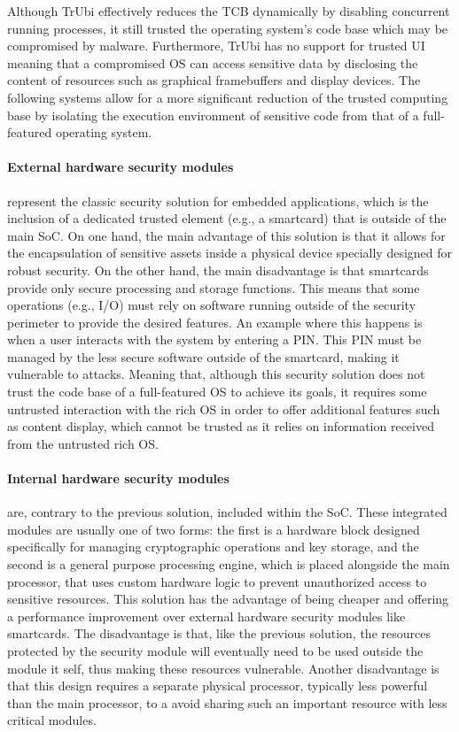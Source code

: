 Although TrUbi effectively reduces the TCB dynamically by disabling concurrent running processes, it still trusted the operating system's code base which may be compromised by malware. Furthermore, TrUbi has no support for trusted UI meaning that a compromised OS can access sensitive data by disclosing the content of resources such as graphical framebuffers and display devices. The following systems allow for a more significant reduction of the trusted computing base by isolating the execution environment of sensitive code from that of a full-featured operating system.

\paragraph{\textbf{External hardware security modules}} represent the classic security solution for embedded applications, which is the inclusion of a dedicated trusted element (e.g., a smartcard) that is outside of the main \ac{SoC}. On one hand, the main advantage of this solution is that it allows for the encapsulation of sensitive assets inside a physical device specially designed for robust security. On the other hand, the main disadvantage is that smartcards provide only secure processing and storage functions. This means that some operations (e.g., I/O) must rely on software running outside of the security perimeter to provide the desired features. An example where this happens is when a user interacts with the system by entering a \ac{PIN}. This \ac{PIN} must be managed by the less secure software outside of the smartcard, making it vulnerable to attacks. Meaning that, although this security solution does not trust the code base of a full-featured OS to achieve its goals, it requires some untrusted interaction with the rich OS in order to offer additional features such as content display, which cannot be trusted as it relies on information received from the untrusted rich OS.

\paragraph{\textbf{Internal hardware security modules}} are, contrary to the previous solution, included within the \ac{SoC}. These integrated modules are usually one of two forms: the first is a hardware block designed specifically for managing cryptographic operations and key storage, and the second is a general purpose processing engine, which is placed alongside the main processor, that uses custom hardware logic to prevent unauthorized access to sensitive resources. This solution has the advantage of being cheaper and offering a performance improvement over external hardware security modules like smartcards. The disadvantage is that, like the previous solution, the resources protected by the security module will eventually need to be used outside the module it self, thus making these resources vulnerable. Another disadvantage is that this design requires a separate physical processor, typically less powerful than the main processor, to a avoid sharing such an important resource with less critical modules.

